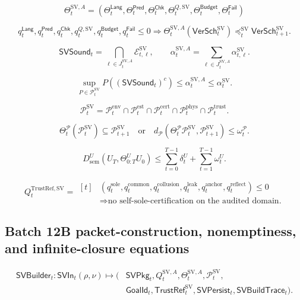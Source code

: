 \documentclass[11pt]{article}
\newcommand{\Pcal}{\mathcal{P}}
\newcommand{\Ecal}{\mathcal{E}}
\newcommand{\1}{\mathbf{1}}
\providecommand{\sem}{\mathrm{sem}}
\providecommand{\sole}{\mathrm{sole}}
\providecommand{\common}{\mathrm{common}}
\providecommand{\collusion}{\mathrm{collusion}}
\providecommand{\leak}{\mathrm{leak}}
\providecommand{\anchor}{\mathrm{anchor}}
\providecommand{\reflect}{\mathrm{reflect}}
\begin{document}
\[
\Theta_t^{\mathrm{SV},A}
=(\Theta_t^{\mathsf{Lang}},\Theta_t^{\mathsf{Pred}},\Theta_t^{\mathsf{Chk}},\Theta_t^{Q,\mathrm{SV}},\Theta_t^{\mathsf{Budget}},\Theta_t^{\mathsf{Fail}})
\]

\[
q_t^{\mathsf{Lang}},q_t^{\mathsf{Pred}},q_t^{\mathsf{Chk}},q_t^{Q,\mathrm{SV}},q_t^{\mathsf{Budget}},q_t^{\mathsf{Fail}}\le0
\Longrightarrow
\Theta_t^{\mathrm{SV},A}(\mathsf{VerSch}_t^{\mathrm{SV}})\preceq_t^{\mathrm{SV}}\mathsf{VerSch}_{t+1}^{\mathrm{SV}}.
\]

\[
\mathsf{SVSound}_t=\bigcap_{\ell\in J_t^{\mathrm{SV},A}}\Ecal_{t,\ell}^{\mathrm{SV}},
\qquad
\alpha_t^{\mathrm{SV},A}=\sum_{\ell\in J_t^{\mathrm{SV},A}}\alpha_{t,\ell}^{\mathrm{SV}}.
\]

\[
\sup_{P\in\Pcal_t^{\mathrm{SV}}}P((\mathsf{SVSound}_t)^c)\le\alpha_t^{\mathrm{SV},A}\le\alpha_t^{\mathrm{SV}}.
\]

\[
\Pcal_t^{\mathrm{SV}}
=
\Pcal_t^{\mathrm{env}}\cap\Pcal_t^{\mathrm{est}}\cap\Pcal_t^{\mathrm{cert}}\cap\Pcal_t^{\mathrm{phys}}\cap\Pcal_t^{\mathrm{trust}}.
\]

\[
\Theta_t^{\Pcal}(\Pcal_t^{\mathrm{SV}})\subseteq\Pcal_{t+1}^{\mathrm{SV}}
\quad\text{or}\quad
d_{\Pcal}(\Theta_t^{\Pcal}\Pcal_t^{\mathrm{SV}},\Pcal_{t+1}^{\mathrm{SV}})\le\omega_t^{\Pcal}.
\]

\[
D_{\sem}^U(U_T,\Theta_{0:T}^UU_0)
\le
\sum_{t=0}^{T-1}\delta_t^U+
\sum_{t=1}^{T-1}\omega_t^U.
\]

\[
Q_t^{\mathrm{TrustRef},\mathrm{SV}}
=
\begin{aligned}[t]
{}&(q_t^{\sole},q_t^{\common},q_t^{\collusion},q_t^{\leak},q_t^{\anchor},q_t^{\reflect})\le0\\
&\Longrightarrow
\text{no self-sole-certification on the audited domain.}
\end{aligned}
\]


\subsection{Batch 12B packet-construction, nonemptiness, and infinite-closure equations}
\label{subsec:batch12b_packet_nonempty_infinite_equations}

\[
\begin{aligned}
\mathsf{SVBuilder}_t:
\mathsf{SVIn}_t(\rho,\nu)
\longmapsto
(&\mathsf{SVPkg}_t,Q_t^{\mathrm{SV},A},
\Theta_t^{\mathrm{SV},A},\Pcal_t^{\mathrm{SV}},\\
&\mathsf{GoalId}_t,
\mathsf{TrustRef}_t^{\mathrm{SV}},
\mathsf{SVPersist}_t,
\mathsf{SVBuildTrace}_t).
\end{aligned}
\]
\end{document}
